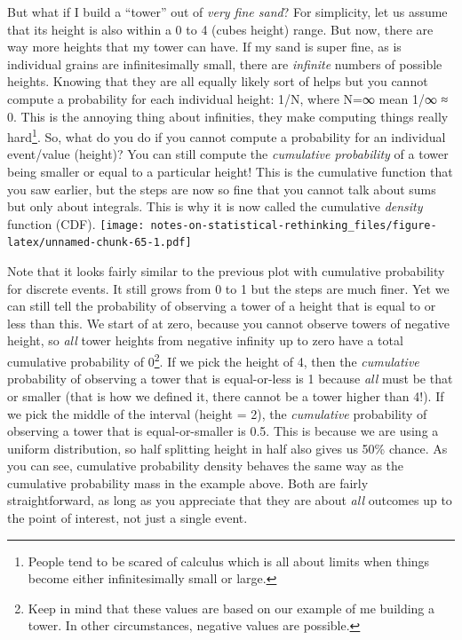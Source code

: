 \documentclass[
]{book}
\begin{document}
But what if I build a ``tower'' out of \emph{very fine sand}? For simplicity, let us assume that its height is also within a 0 to 4 (cubes height) range. But now, there are way more heights that my tower can have. If my sand is super fine, as is individual grains are infinitesimally small, there are \emph{infinite} numbers of possible heights. Knowing that they are all equally likely sort of helps but you cannot compute a probability for each individual height: 1/N, where N=∞ mean 1/∞ ≈ 0. This is the annoying thing about infinities, they make computing things really hard\footnote{People tend to be scared of calculus which is all about limits when things become either infinitesimally small or large.}. So, what do you do if you cannot compute a probability for an individual event/value (height)? You can still compute the \emph{cumulative probability} of a tower being smaller or equal to a particular height! This is the cumulative function that you saw earlier, but the steps are now so fine that you cannot talk about sums but only about integrals. This is why it is now called the cumulative \emph{density} function (CDF).
\texttt{[image: notes-on-statistical-rethinking\_files/figure-latex/unnamed-chunk-65-1.pdf]}

Note that it looks fairly similar to the previous plot with cumulative probability for discrete events. It still grows from 0 to 1 but the steps are much finer. Yet we can still tell the probability of observing a tower of a height that is equal to or less than this. We start of at zero, because you cannot observe towers of negative height, so \emph{all} tower heights from negative infinity up to zero have a total cumulative probability of 0\footnote{Keep in mind that these values are based on our example of me building a tower. In other circumstances, negative values are possible.}. If we pick the height of 4, then the \emph{cumulative} probability of observing a tower that is equal-or-less is 1 because \emph{all} must be that or smaller (that is how we defined it, there cannot be a tower higher than 4!). If we pick the middle of the interval (height = 2), the \emph{cumulative} probability of observing a tower that is equal-or-smaller is 0.5. This is because we are using a uniform distribution, so half splitting height in half also gives us 50\% chance. As you can see, cumulative probability density behaves the same way as the cumulative probability mass in the example above. Both are fairly straightforward, as long as you appreciate that they are about \emph{all} outcomes up to the point of interest, not just a single event.
\end{document}

